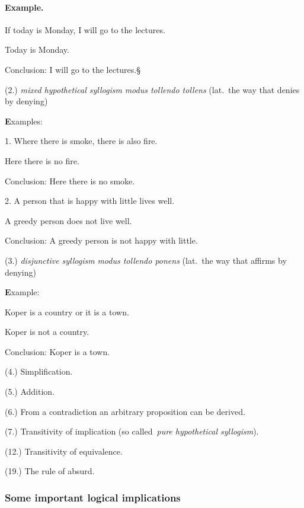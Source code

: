 \documentclass[11pt,paper=b5,footinclude,headinclude]{scrbook} %
\def\kz{{\hfill{\S}}}%
\theoremstyle{remark}
\theoremstyle{definition} %
\begin{document}
\paragraph{Example.}
If today is Monday, I will go to the lectures.

Today is Monday.

Conclusion: I will go to the lectures.\kz


(2.) {\em mixed hypothetical syllogism} {\em modus tollendo tollens} (lat.~the way that denies by denying)

{\textbf Examples:}

1. Where there is smoke, there is also fire.

Here there is no fire.

Conclusion: Here there is no smoke.

2. A person that is happy with little lives well.

A greedy person does not live well.

Conclusion: A greedy person is not happy with little.


(3.) {\em disjunctive syllogism} {\em modus tollendo ponens}
(lat.~the way that affirms by denying)


\medskip
{\textbf Example:}

Koper is a country or it is a town.

Koper is not a country.

Conclusion: Koper is a town.

(4.) Simplification.

(5.) Addition.

(6.) From a contradiction an arbitrary proposition can be derived.

(7.) Transitivity of implication (so called~{\em pure hypothetical syllogism}).

(12.) Transitivity of equivalence.

(19.) The rule of absurd.

\subsubsection*{Some important logical implications}
\end{document}
